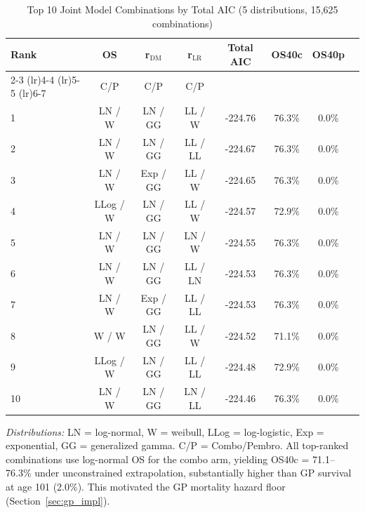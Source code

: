 \documentclass[11pt,a4paper]{article}
\begin{document}
\begin{table}[H]
\centering
\caption{Top 10 Joint Model Combinations by Total AIC\protect\footnotemark{} (5 distributions, 15,625 combinations)}
\label{tab:s4}
\begin{tabular*}{\textwidth}{@{\extracolsep{\fill}}lccccccc}
\toprule
\textbf{Rank} & \textbf{OS} & \textbf{r$_{\text{DM}}$} & \textbf{r$_{\text{LR}}$} & \textbf{Total AIC} & \textbf{OS40c} & \textbf{OS40p} \\
\cmidrule(lr){2-3} \cmidrule(lr){4-4} \cmidrule(lr){5-5} \cmidrule(lr){6-7}
 & C/P & C/P & C/P & & & \\
\midrule
1 & LN / W & LN / GG & LL / W & -224.76 & 76.3\% & 0.0\% \\
2 & LN / W & LN / GG & LL / LL & -224.67 & 76.3\% & 0.0\% \\
3 & LN / W & Exp / GG & LL / W & -224.65 & 76.3\% & 0.0\% \\
4 & LLog / W & LN / GG & LL / W & -224.57 & 72.9\% & 0.0\% \\
5 & LN / W & LN / GG & LN / W & -224.55 & 76.3\% & 0.0\% \\
6 & LN / W & LN / GG & LL / LN & -224.53 & 76.3\% & 0.0\% \\
7 & LN / W & Exp / GG & LL / LL & -224.53 & 76.3\% & 0.0\% \\
8 & W / W & LN / GG & LL / W & -224.52 & 71.1\% & 0.0\% \\
9 & LLog / W & LN / GG & LL / LL & -224.48 & 72.9\% & 0.0\% \\
10 & LN / W & LN / GG & LN / LL & -224.46 & 76.3\% & 0.0\% \\
\bottomrule
\end{tabular*}
\end{table}
\noindent\textit{Distributions:} LN = log-normal, W = weibull, LLog = log-logistic, Exp = exponential, GG = generalized gamma. C/P = Combo/Pembro. All top-ranked combinations use log-normal OS for the combo arm, yielding OS40c = 71.1--76.3\% under unconstrained extrapolation, substantially higher than GP survival at age 101 (2.0\%). This motivated the GP mortality hazard floor (Section~\ref{sec:gp_impl}).
\end{document}
